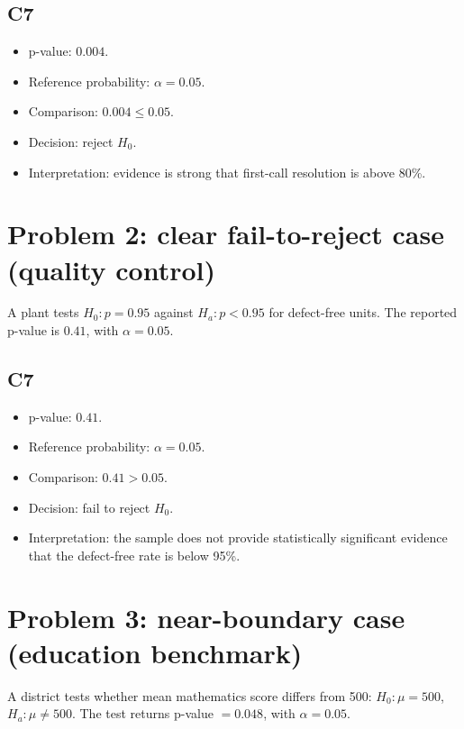 \begin{ExamProblems}
\subsection*{C7}
\begin{itemize}
    \item p-value: \(0.004\).
    \item Reference probability: \(\alpha=0.05\).
    \item Comparison: \(0.004 \le 0.05\).
    \item Decision: reject \(H_0\).
    \item Interpretation: evidence is strong that first-call resolution is above 80\%.
\end{itemize}

\item
\section{Problem 2: clear fail-to-reject case (quality control)}
A plant tests \(H_0:p=0.95\) against \(H_a:p<0.95\) for defect-free units.
The reported p-value is \(0.41\), with \(\alpha=0.05\).

\subsection*{C7}
\begin{itemize}
    \item p-value: \(0.41\).
    \item Reference probability: \(\alpha=0.05\).
    \item Comparison: \(0.41>0.05\).
    \item Decision: fail to reject \(H_0\).
    \item Interpretation: the sample does not provide statistically significant evidence that the defect-free rate is below 95\%.
\end{itemize}

\item
\section{Problem 3: near-boundary case (education benchmark)}
A district tests whether mean mathematics score differs from 500:
\(H_0:\mu=500\), \(H_a:\mu\ne 500\).
The test returns p-value \(=0.048\), with \(\alpha=0.05\).


\end{ExamProblems}
